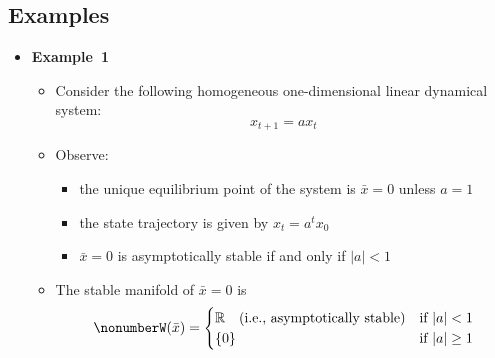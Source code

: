\documentclass[12pt,a4paper]{article}
\begin{document}
\subsection{Examples}

\begin{itemize}

\item \textbf{Example~1}
  \begin{itemize}
  \item Consider the following homogeneous one-dimensional linear dynamical system:
    \begin{equation}\nonumber%
      x_{t+1} = a x_{t}%
    \end{equation}
  \item Observe:
    \begin{itemize}
    \item the unique equilibrium point of the system is $\bar{x}=0$ unless $a=1$%
    \item the state trajectory is given by $x_{t} = a^{t} x_{0}$
    \item $\bar{x}=0$ is asymptotically stable if and only if $|a|<1$
    \end{itemize}
  \item The stable manifold of $\bar{x}=0$ is
    \begin{equation}\nonumber%
      W(\bar{x}) =
      \begin{cases}
        \R \quad\text{(i.e., asymptotically stable)} & \text{if $|a|<1$} \\
        \{0\} & \text{if $|a|\geq 1$} \\
      \end{cases}
    \end{equation}
  \end{itemize}


\end{itemize}
\end{document}
